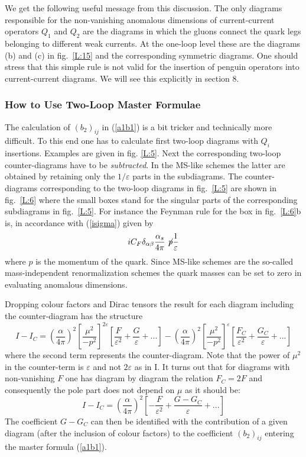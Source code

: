 \documentclass[12pt,rotate]{article}
\def\eps{\varepsilon}
\newcommand{\be}{\begin{equation}}
\newcommand{\ee}{\end{equation}}
\begin{document}
\begin{itemize}
\begin{itemize}
\begin{itemize}
We get the following useful message from this discussion. The only diagrams
responsible for the non-vanishing anomalous dimensions of current-current 
operators $Q_1$ and $Q_2$ are the diagrams in which the gluons connect the
quark legs belonging to different weak currents. At the one-loop level these
are the diagrams (b) and (c) in fig.\ \ref{L:15} and the 
corresponding symmetric diagrams. One should stress that this simple
rule is not valid for the insertion of penguin operators into
current-current diagrams. We will see this explicitly in section 8.
\subsubsection{How to Use Two-Loop Master Formulae}
The calculation of $(b_2)_{ij}$ in (\ref{a1b1}) is a bit tricker
and technically more difficult. To this end one has to calculate first
two-loop diagrams with $Q_i$ insertions. Examples are given 
in fig. \ref{L:5}.
Next the corresponding two-loop counter-diagrams have to be 
{\it subtracted}. 
In the MS-like schemes the latter are obtained by retaining
only the $1/\eps$ parts in the subdiagrams. The counter-diagrams
corresponding to the two-loop diagrams in fig.~\ref{L:5} are shown 
in fig.~\ref{L:6}
where the small boxes stand for the singular parts of 
the corresponding subdiagrams in fig.~\ref{L:5}. 
For instance the Feynman rule
for the box in fig.~\ref{L:6}b is, in accordance with (\ref{isigma})  
given by
\begin{equation}\label{sigma1}
i C_F \delta_{\alpha\beta}  
\frac{\alpha_s}{4\pi} \not\! p
 \frac{1}{\varepsilon} 
\end{equation} 
where $p$ is the momentum of the quark. Since MS-like schemes are
the so-called mass-independent renormalization schemes the quark masses
can be set to zero in evaluating anomalous dimensions. 

Dropping colour factors and Dirac tensors the result for each diagram
including the counter-diagram has the structure
\be\label{IMIC}
I-I_C=\left(\frac{\alpha}{4\pi}\right)^2
\left[\frac{\mu^2}{-p^2}\right]^{2\eps}
\left[\frac{F}{\eps^2}+\frac{G}{\eps}+...\right]
-\left(\frac{\alpha}{4\pi}\right)^2
\left[\frac{\mu^2}{-p^2}\right]^{\eps}
\left[\frac{F_C}{\eps^2}+\frac{G_C}{\eps}+...\right]
\ee
where the second term represents the counter-diagram. 
Note that the power of $\mu^2$ in the counter-term is $\varepsilon$
and not $2 \varepsilon$ as in I.
It turns out
that for diagrams with non-vanishing $F$ one has diagram by diagram
the relation $F_C=2 F$ and consequently the pole part does not depend on
$\mu$ as it should be:
\be\label{IMICA}
I-I_C=\left(\frac{\alpha}{4\pi}\right)^2
\left[-\frac{F}{\eps^2}+\frac{G-G_C}{\eps}+...\right]
\ee
The coefficient $G-G_C$ can then be identified with the contribution
of a given diagram (after the inclusion of colour factors) to the
coefficient $(b_2)_{ij}$ entering the master formula (\ref{a1b1}).



\end{itemize}
\end{itemize}
\end{itemize}
\end{document}
